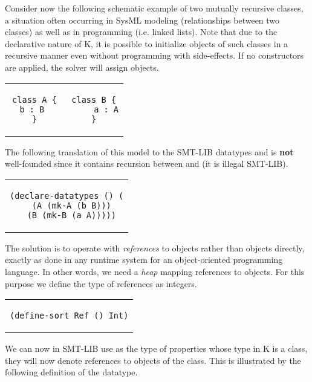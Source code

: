 Consider now the following schematic example of two mutually recursive
classes, a situation often occurring in SysML modeling (relationships
between two classes) as well as in programming (i.e. linked lists).
Note that due to the declarative nature of K, it is possible to initialize
objects of such classes in a recursive manner even without programming with side-effects.
If no constructors are applied, the solver will assign objects.

\lstset{language=K,numbers=none}

\begin{center}
\begin{tabular}{c}
\small
\begin{lstlisting}
class A {   class B {
  b : B          a : A
}           }
\end{lstlisting}
\end{tabular}
\end{center}

\noindent The following translation of this model to the SMT-LIB
datatypes  and  is {\bf not} well-founded since it
contains recursion between  and  (it is illegal
SMT-LIB).

\lstset{language=SMT,numbers=none}

\begin{center}
\begin{tabular}{c}
\small
\begin{lstlisting}
(declare-datatypes () (
  (A (mk-A (b B)))
  (B (mk-B (a A)))))
\end{lstlisting}
\end{tabular}
\end{center}

\noindent The solution is to operate with {\em references} to objects rather
than objects directly, exactly as done in any runtime system for an
object-oriented programming language. In other words, we need a {\em
  heap} mapping references to objects. For this purpose we define
the type of references as integers.

\begin{center}
\begin{tabular}{c}
\small
\begin{lstlisting}
(define-sort Ref () Int)
\end{lstlisting}
\end{tabular}
\end{center}

\noindent We can now in SMT-LIB use  as the type of properties whose 
type in K is a class, they will now denote references to objects of the class.
This is illustrated by the following definition of the  datatype.

